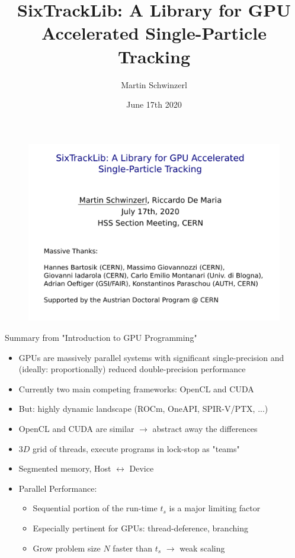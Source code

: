 \documentclass{beamer}
\title[SixTrackLib]{SixTrackLib: A Library for GPU Accelerated Single-Particle Tracking}
\author{Martin Schwinzerl}
\date{June 17th 2020}
\begin{document}
\begin{frame}
\begin{figure}
    \centering
    \includegraphics[width=\textwidth]{images/title.png}
\end{figure}
\end{frame}

\begin{frame}{Summary from "Introduction to GPU Programming"}
\begin{itemize}
    \item GPUs are massively parallel systems with significant single-precision and (ideally: proportionally) reduced double-precision performance
    \item Currently two main competing frameworks: OpenCL and CUDA
    \item But: highly dynamic landscape (ROCm, OneAPI, SPIR-V/PTX, ...)
    \item OpenCL and CUDA are similar $\rightarrow$ abstract away the differences
    \item $3D$ grid of threads, execute programs in lock-stop as "teams" 
    \item Segmented memory, Host $\leftrightarrow$ Device
    \item Parallel Performance:
    \begin{itemize}
        \item Sequential portion of the run-time $t_s$ is a major limiting factor
        \item Especially pertinent for GPUs: thread-deference, branching
        \item Grow problem size $N$ faster than $t_s$ $\rightarrow$ weak scaling
    \end{itemize}
\end{itemize}
\end{frame}
\end{document}
